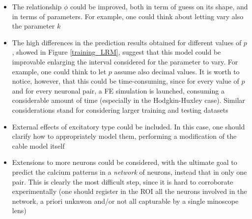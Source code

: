 \documentclass[12pt, a4paper]{report}
\begin{document}
\begin{itemize}
	\item The relationship $\phi$ could be improved, both in term of guess on its shape, and in terms of parameters. For example, one could think about letting vary also the parameter $k$
	
	\item The high differences in the prediction results obtained for different values of $p$, showed in Figure \ref{training_LRM}, suggest that this model could be improvable enlarging the interval considered for the parameter to vary. For example, one could think to let $p$ assume also decimal values. It is worth to notice, however, that this could be time-consuming, since for every value of $p$ and for every neuronal pair, a FE simulation is launched, consuming a considerable amount of time (especially in the Hodgkin-Huxley case). Similar considerations stand for considering larger training and testing datasets
	
	\item External effects of excitatory type could be included. In this case, one should clarify how to appropriately model them, performing a modification of the cable model itself
	
	\item Extensions to more neurons could be considered, with the ultimate goal to predict the calcium patterns in a \textit{network} of neurons, instead that in only one pair. This is clearly the most difficult step, since it is hard to corroborate experimentally (one should register in the ROI all the neurons involved in the network, a priori unknwon and/or not all capturable by a single minoscope lens)
	
\end{itemize}  
\end{document}
